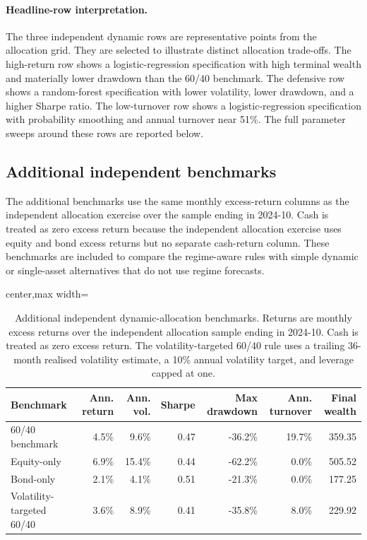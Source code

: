 



\paragraph{Headline-row interpretation.}
The three independent dynamic rows are representative points from the allocation grid.
They are selected to illustrate distinct allocation trade-offs. The high-return row shows a
logistic-regression specification with high terminal wealth and materially lower drawdown
than the 60/40 benchmark. The defensive row shows a random-forest specification with lower
volatility, lower drawdown, and a higher Sharpe ratio. The low-turnover row shows a
logistic-regression specification with probability smoothing and annual turnover near
51\%. The full parameter sweeps around these rows are reported below.

\subsection{Additional independent benchmarks}
\label{app:independent-dynamic-benchmarks}

The additional benchmarks use the same monthly excess-return columns as the independent
allocation exercise over the sample ending in 2024-10. Cash is treated as zero excess return
because the independent allocation exercise uses equity and bond excess returns but no
separate cash-return column. These benchmarks are included to compare the regime-aware rules
with simple dynamic or single-asset alternatives that do not use regime forecasts.

\begin{table}[H]
\centering
\small
\begin{adjustbox}{center,max width=\linewidth}
\begin{tabular}{lrrrrrr}
\toprule
Benchmark & Ann. return & Ann. vol. & Sharpe & Max drawdown & Ann. turnover & Final wealth \\
\midrule
60/40 benchmark & 4.5\% & 9.6\% & 0.47 & -36.2\% & 19.7\% & 359.35 \\
Equity-only & 6.9\% & 15.4\% & 0.44 & -62.2\% & 0.0\% & 505.52 \\
Bond-only & 2.1\% & 4.1\% & 0.51 & -21.3\% & 0.0\% & 177.25 \\
Volatility-targeted 60/40 & 3.6\% & 8.9\% & 0.41 & -35.8\% & 8.0\% & 229.92 \\
\bottomrule
\end{tabular}
\end{adjustbox}
\caption{Additional independent dynamic-allocation benchmarks. Returns are monthly excess
returns over the independent allocation sample ending in 2024-10. Cash is treated as zero
excess return. The volatility-targeted 60/40 rule uses a trailing 36-month realised
volatility estimate, a 10\% annual volatility target, and leverage capped at one.}
\label{tab:independent-dynamic-benchmarks}
\end{table}

